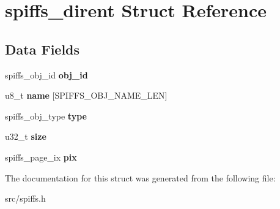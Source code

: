 \hypertarget{structspiffs__dirent}{}\section{spiffs\+\_\+dirent Struct Reference}
\label{structspiffs__dirent}
\subsection*{Data Fields}
\begin{DoxyCompactItemize}
\item 
\mbox{\label{structspiffs__dirent_adb9c8e8a7c378611c58c02c4a28a9d85}} 
spiffs\+\_\+obj\+\_\+id {\bfseries obj\+\_\+id}
\item 
\mbox{\label{structspiffs__dirent_abd0b462b485b05eb9ee1703b1ee5beab}} 
u8\+\_\+t {\bfseries name} \mbox{[}S\+P\+I\+F\+F\+S\+\_\+\+O\+B\+J\+\_\+\+N\+A\+M\+E\+\_\+\+L\+EN\mbox{]}
\item 
\mbox{\label{structspiffs__dirent_a38414e80ef79bb9dcf421555e9435f89}} 
spiffs\+\_\+obj\+\_\+type {\bfseries type}
\item 
\mbox{\label{structspiffs__dirent_a5cbe52f4c2bb069e109857246decc01b}} 
u32\+\_\+t {\bfseries size}
\item 
\mbox{\label{structspiffs__dirent_af3dd1aaf484385078fa8f171c6c9456d}} 
spiffs\+\_\+page\+\_\+ix {\bfseries pix}
\end{DoxyCompactItemize}


The documentation for this struct was generated from the following file\+:\begin{DoxyCompactItemize}
\item 
src/spiffs.\+h\end{DoxyCompactItemize}
